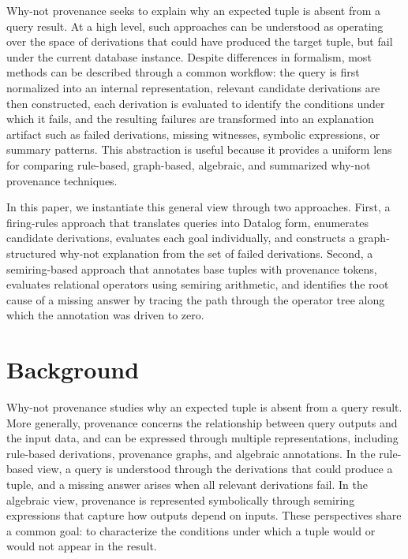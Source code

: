 \documentclass{llncs}
\begin{document}
Why-not provenance seeks to explain why an expected tuple is absent
from a query result. At a high level, such approaches can be
understood as operating over the space of derivations that could have
produced the target tuple, but fail under the current database
instance. Despite differences in formalism, most methods can be
described through a common workflow: the query is first normalized
into an internal representation, relevant candidate derivations are
then constructed, each derivation is evaluated to identify the
conditions under which it fails, and the resulting failures are
transformed into an explanation artifact such as failed derivations,
missing witnesses, symbolic expressions, or summary patterns. This
abstraction is useful because it provides a uniform lens for comparing
rule-based, graph-based, algebraic, and summarized why-not provenance
techniques.

In this paper, we instantiate this general view through two
approaches. First, a firing-rules approach that translates queries
into Datalog form, enumerates candidate derivations, evaluates each
goal individually, and constructs a graph-structured why-not
explanation from the set of failed derivations. Second, a
semiring-based approach that annotates base tuples with provenance
tokens, evaluates relational operators using semiring arithmetic, and
identifies the root cause of a missing answer by tracing the path
through the operator tree along which the annotation was driven to
zero.

\section{Background}
\label{sec:background}

Why-not provenance studies why an expected tuple is absent from a
query result. More generally, provenance concerns the relationship
between query outputs and the input data, and can be expressed through
multiple representations, including rule-based derivations, provenance
graphs, and algebraic annotations. In the rule-based view, a query is
understood through the derivations that could produce a tuple, and a
missing answer arises when all relevant derivations fail. In the
algebraic view, provenance is represented symbolically through
semiring expressions that capture how outputs depend on inputs.
These perspectives share a common goal: to characterize the conditions
under which a tuple would or would not appear in the result.
\end{document}
